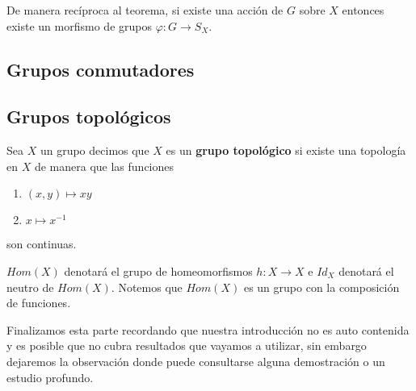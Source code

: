 	\begin{nt}
	De manera recíproca al teorema, si existe una acción de $G$ sobre $X$ entonces existe un morfismo de grupos $\varphi:G \to S_X$.  
	\end{nt}
	
\subsection{Grupos conmutadores}

	
	
	
	\subsection*{Grupos topológicos}
		
	\begin{df}
	Sea $X$ un grupo decimos que $X$ es un \textbf{grupo topológico} si existe una topología en $X$ de manera que las funciones 
	\begin{enumerate}
	\item $(x,y) \mapsto xy$
	\item $x \mapsto x^{-1}$
	\end{enumerate}
son continuas.	
	\end{df}
	
	
	\begin{cn} $Hom(X)$ denotará el grupo de homeomorfismos $h:X \to X$ e  $Id_X$ denotará el neutro de $Hom(X)$. Notemos que $Hom(X)$ es un grupo con la composición de funciones.
	\end{cn}
Finalizamos esta parte recordando que nuestra introducción no es auto contenida y es posible que no cubra resultados que vayamos a utilizar, sin embargo dejaremos la observación donde puede consultarse alguna demostración o un estudio profundo.
	
	
	


 
